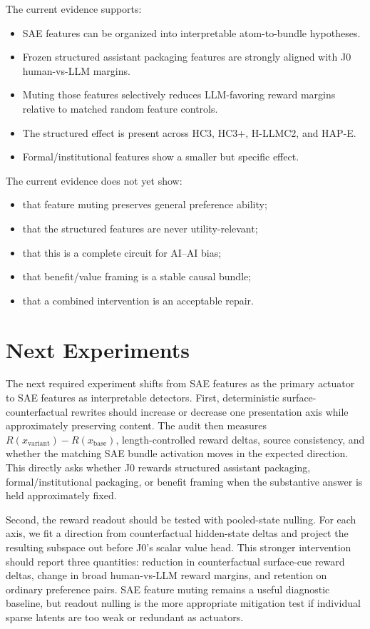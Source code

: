 \documentclass[11pt]{article}
\begin{document}
The current evidence supports:

\begin{itemize}[leftmargin=1.5em]
\item SAE features can be organized into interpretable atom-to-bundle
      hypotheses.
\item Frozen structured assistant packaging features are strongly aligned with
      J0 human-vs-LLM margins.
\item Muting those features selectively reduces LLM-favoring reward margins
      relative to matched random feature controls.
\item The structured effect is present across HC3, HC3+, H-LLMC2, and HAP-E.
\item Formal/institutional features show a smaller but specific effect.
\end{itemize}

The current evidence does not yet show:

\begin{itemize}[leftmargin=1.5em]
\item that feature muting preserves general preference ability;
\item that the structured features are never utility-relevant;
\item that this is a complete circuit for AI--AI bias;
\item that benefit/value framing is a stable causal bundle;
\item that a combined intervention is an acceptable repair.
\end{itemize}

\section{Next Experiments}

The next required experiment shifts from SAE features as the primary actuator
to SAE features as interpretable detectors. First, deterministic
surface-counterfactual rewrites should increase or decrease one presentation
axis while approximately preserving content. The audit then measures
\(R(x_{\mathrm{variant}})-R(x_{\mathrm{base}})\), length-controlled reward
deltas, source consistency, and whether the matching SAE bundle activation
moves in the expected direction. This directly asks whether J0 rewards
structured assistant packaging, formal/institutional packaging, or benefit
framing when the substantive answer is held approximately fixed.

Second, the reward readout should be tested with pooled-state nulling. For each
axis, we fit a direction from counterfactual hidden-state deltas and project
the resulting subspace out before J0's scalar value head. This stronger
intervention should report three quantities: reduction in counterfactual
surface-cue reward deltas, change in broad human-vs-LLM reward margins, and
retention on ordinary preference pairs. SAE feature muting remains a useful
diagnostic baseline, but readout nulling is the more appropriate mitigation
test if individual sparse latents are too weak or redundant as actuators.
\end{document}
